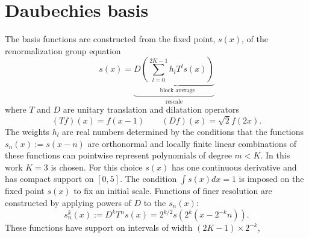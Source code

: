 \documentclass[aps,prc,reprint,showpacs,groupedaddress,onecolumn]{revtex4}
\def\beq{\begin{equation}}
\def\eeq{\end{equation}}
\begin{document}
\section{Daubechies basis}
\label{sec:1}
The basis functions are constructed from the fixed point, $s(x)$, of the 
renormalization group equation
\beq
{s(x)} = \underbrace{D
\underbrace{(\sum_{l=0}^{2K-1} h_l T^l {s(x)})}_{\mbox{block average}}
}_{\mbox{rescale}} 
\label{eq:1}
\eeq
where $T$ and $D$ are unitary translation and dilatation operators 
\[
(Tf)(x) = f(x-1) \qquad (Df)(x) = \sqrt{2} f(2x).
\]
The weights $h_l$ are real numbers determined by the conditions that
the functions $s_n(x):=s(x-n)$ are orthonormal and locally finite
linear combinations of these functions can pointwise represent
polynomials of degree $m<K$.  In this work $K=3$ is chosen.  For this
choice $s(x)$ has one continuous derivative and has compact support on
$[0,5]$.  The condition $\int s(x) dx =1$ is imposed on the fixed
point $s(x)$ to fix an initial scale.
Functions of finer resolution are constructed by applying powers of
$D$ to the $s_n(x)$:
%
\[
s^k_n (x) := D^k T^n s(x) = 2^{k/2} s\left (2^k(x-2^{-k}n)\right ) .
\]
These functions have support on intervals of width $(2K-1) \times 2^{-k}$, 
\end{document}
